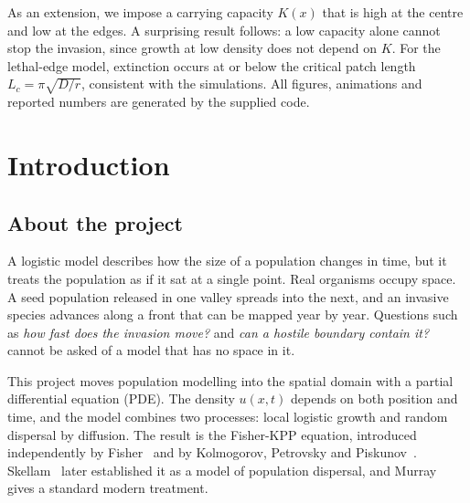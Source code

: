 \documentclass[11pt,a4paper]{article}
\begin{document}
As an extension, we impose a carrying capacity $K(x)$ that is high at the centre and low at the
edges. A surprising result follows: a low capacity alone cannot stop the invasion, since growth at
low density does not depend on $K$. For the lethal-edge model, extinction occurs at or below the critical patch length $L_c=\pi\sqrt{D/r}$, consistent with the simulations. All figures,
animations and reported numbers are generated by the supplied code.

\clearpage
\tableofcontents
\clearpage
{}
\setcounter{page}{1}

\section{Introduction}

\subsection{About the project}
A logistic model describes how the size of a population changes in time, but it treats the
population as if it sat at a single point. Real organisms occupy space. A seed population released
in one valley spreads into the next, and an invasive species advances along a front that can be
mapped year by year. Questions such as \emph{how fast does the invasion move?} and \emph{can a hostile
boundary contain it?} cannot be asked of a model that has no space in it.

This project moves population modelling into the spatial domain with a partial differential
equation (PDE). The density $u(x,t)$ depends on both position and time, and the model combines
two processes: local logistic growth and random dispersal by diffusion. The result is the Fisher-KPP
equation, introduced independently by Fisher~\cite{fisher} and by Kolmogorov, Petrovsky and
Piskunov~\cite{kpp}. Skellam~\cite{skellam} later established it as a model of population dispersal, and Murray~\cite{murray}
gives a standard modern treatment.
\end{document}
